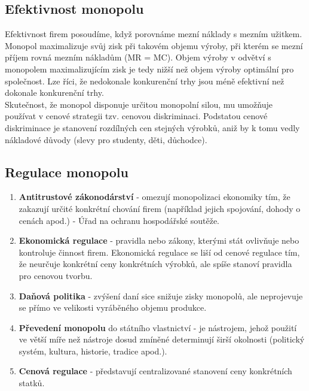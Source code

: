 \subsection{Efektivnost monopolu}
Efektivnost firem posoudíme, když porovnáme mezní náklady s mezním užitkem. Monopol
maximalizuje svůj zisk při takovém objemu výroby, při kterém se mezní příjem rovná
mezním nákladům (MR = MC). Objem výroby v odvětví s monopolem maximalizujícím zisk je tedy
nižší než objem výroby optimální pro společnost. Lze říci, že nedokonale konkurenční trhy jsou méně
efektivní než dokonale konkurenční trhy.\\
Skutečnost, že monopol disponuje určitou monopolní silou, mu umožňuje používat v cenové
strategii tzv. cenovou diskriminaci. Podstatou cenové diskriminace je stanovení rozdílných
cen stejných výrobků, aniž by k tomu vedly nákladové důvody (slevy pro studenty, děti, důchodce).

\subsection{Regulace monopolu}
\begin{enumerate}
    \item \textbf{Antitrustové zákonodárství} - omezují monopolizaci ekonomiky tím, že zakazují určité
    konkrétní chování firem (například jejich spojování, dohody o cenách apod.) - Úřad na
    ochranu hospodářské soutěže.
    \item \textbf{Ekonomická regulace} - pravidla nebo zákony, kterými stát ovlivňuje nebo
    kontroluje činnost firem. Ekonomická regulace se liší od cenové regulace tím, že neurčuje
    konkrétní ceny konkrétních výrobků, ale spíše stanoví pravidla pro cenovou tvorbu.
    \item \textbf{Daňová politika} - zvýšení daní sice snižuje zisky monopolů, ale neprojevuje se přímo
    ve velikosti vyráběného objemu produkce.
    \item \textbf{Převedení monopolu} do státního vlastnictví - je nástrojem, jehož použití ve větší míře než
    nástroje dosud zmíněné determinují širší okolnosti (politický systém, kultura, historie,
    tradice apod.).
    \item \textbf{Cenová regulace} - představují centralizované stanovení ceny konkrétních statků.
\end{enumerate}